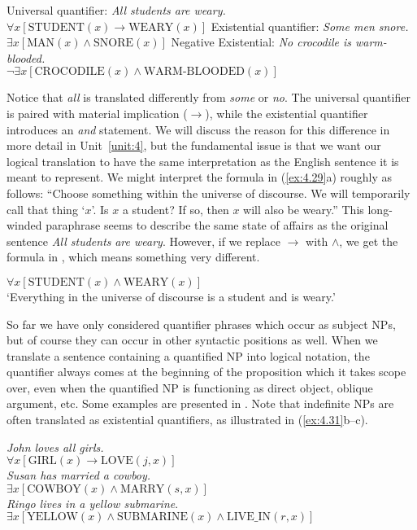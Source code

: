\ea \label{ex:4.29}
\ea  Universal quantifier: \textit{All students are weary.}\\
$\forall x [\text{STUDENT}(x) \rightarrow \text{WEARY}(x)]$
\ex  Existential quantifier: \textit{Some men snore.}\\
$\exists x[\text{MAN}(x) \wedge \text{SNORE}(x)]$
\ex  Negative Existential: \textit{No crocodile is warm-blooded.}\\
$\neg\exists x[\text{CROCODILE}(x) \wedge \text{WARM-BLOODED}(x)]$
\z \z

Notice that \textit{all} is translated differently from \textit{some} or \textit{no}. The universal quantifier is paired with material implication ($\rightarrow$), while the existential quantifier introduces an \textit{and} statement. We will discuss the reason for this difference in more detail in Unit~\ref{unit:4}, but the fundamental issue is that we want our logical translation to have the same interpretation as the English sentence it is meant to represent. We might interpret the formula in (\ref{ex:4.29}a) roughly as follows: “Choose something within the universe of discourse. We will temporarily call that thing ‘$x$’. Is $x$ a student? If so, then $x$ will also be weary.” This long-winded paraphrase seems to describe the same state of affairs as the original sentence \textit{All students} \textit{are weary}. However, if we replace $\rightarrow$ with $\wedge$, we get the formula in , which means something very different.

\ea \label{ex:4.30}
$\forall x[\text{STUDENT}(x) \wedge \text{WEARY}(x)]$\\
‘Everything in the universe of discourse is a student and is weary.’
\z


So far we have only considered quantifier phrases which occur as subject NPs, but of course they can occur in other syntactic positions as well. When we translate a sentence containing a quantified NP into logical notation, the quantifier always comes at the beginning of the proposition which it takes scope over, even when the quantified NP is functioning as direct object, oblique argument, etc. Some examples are presented in . Note that indefinite NPs are often translated as existential quantifiers, as illustrated in (\ref{ex:4.31}b--c).


\ea \label{ex:4.31}
\ea \textit{John loves all girls.}\\
  $\forall x[\text{GIRL}(x) \rightarrow \text{LOVE}(j,x)]$\\
\ex \textit{Susan has married a cowboy.}\\
  $\exists x[\text{COWBOY}(x) \wedge \text{MARRY}(s,x)]$\\
\ex \textit{Ringo lives in a yellow submarine}.\\
  $\exists x[\text{YELLOW}(x) \wedge \text{SUBMARINE}(x) \wedge \text{LIVE\_IN}(r,x)]$
  \z
\z


